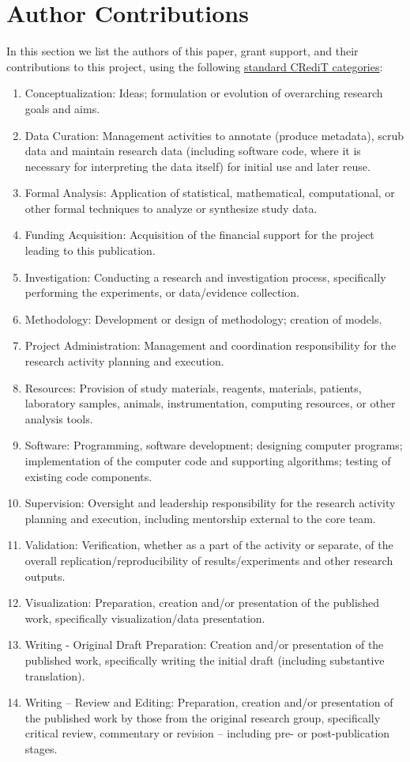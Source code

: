 
\section{Author Contributions}

In this section we list the authors of this paper, grant support, and their contributions to this project, using the following \href{https://credit.niso.org/}{standard CRediT categories}:

\begin{enumerate}
    \item Conceptualization: Ideas; formulation or evolution of overarching research goals and aims.
    \item Data Curation: Management activities to annotate (produce metadata), scrub data and maintain research data (including software code, where it is necessary for interpreting the data itself) for initial use and later reuse.
    \item Formal Analysis: Application of statistical, mathematical, computational, or other formal techniques to analyze or synthesize study data.
    \item Funding Acquisition: Acquisition of the financial support for the project leading to this publication.
    \item Investigation: Conducting a research and investigation process, specifically performing the experiments, or data/evidence collection.
    \item Methodology: Development or design of methodology; creation of models.
    \item Project Administration: Management and coordination responsibility for the research activity planning and execution.
    \item Resources: Provision of study materials, reagents, materials, patients, laboratory samples, animals, instrumentation, computing resources, or other analysis tools.
    \item Software: Programming, software development; designing computer programs; implementation of the computer code and supporting algorithms; testing of existing code components.
    \item Supervision: Oversight and leadership responsibility for the research activity planning and execution, including mentorship external to the core team.
    \item Validation: Verification, whether as a part of the activity or separate, of the overall replication/reproducibility of results/experiments and other research outputs.
    \item Visualization: Preparation, creation and/or presentation of the published work, specifically visualization/data presentation.
    \item Writing - Original Draft Preparation: Creation and/or presentation of the published work, specifically writing the initial draft (including substantive translation).
    \item Writing – Review and Editing: Preparation, creation and/or presentation of the published work by those from the original research group, specifically critical review, commentary or revision – including pre- or post-publication stages.
\end{enumerate}

